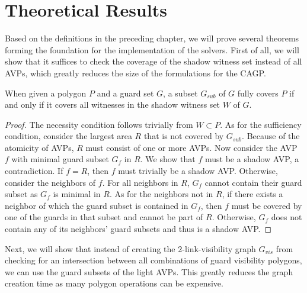 \chapter{Theoretical Results}\label{ch:theoretical_results}
Based on the definitions in the preceding chapter, we will prove several theorems forming the foundation for the implementation of the solvers. First of all, we will show that it suffices to check the coverage of the shadow witness set instead of all AVPs, which greatly reduces the size of the formulations for the CAGP.

\begin{theorem}\label{thm:shadow_coverage}
When given a polygon $P$ and a guard set $G$, a subset $G_{sub}$ of $G$ fully covers $P$ if and only if it covers all witnesses in the shadow witness set $W$ of $G$. 
\end{theorem}
\begin{proof}
The necessity condition follows trivially from $W\subset P$. As for the sufficiency condition, consider the largest area $R$ that is not covered by $G_{sub}$. Because of the atomicity of AVPs, $R$ must consist of one or more AVPs. Now consider the AVP $f$ with minimal guard subset $G_{f}$ in $R$. We show that $f$ must be a shadow AVP, a contradiction. If $f = R$, then $f$ must trivially be a shadow AVP. Otherwise, consider the neighbors of $f$. For all neighbors in $R$, $G_{f}$ cannot contain their guard subset as $G_{f}$ is minimal in $R$. As for the neighbors not in $R$, if there exists a neighbor of which the guard subset is contained in $G_{f}$, then $f$ must be covered by one of the guards in that subset and cannot be part of $R$. Otherwise, $G_{f}$ does not contain any of its neighbors' guard subsets and thus is a shadow AVP.
\end{proof}

Next, we will show that instead of creating the 2-link-visibility graph $G_{vis}$ from checking for an intersection between all combinations of guard visibility polygons, we can use the guard subsets of the light AVPs. This greatly reduces the graph creation time as many polygon operations can be expensive.

